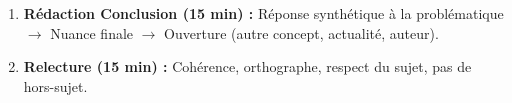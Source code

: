 \documentclass[11pt]{article}
\begin{document}
\begin{methode}
\begin{enumerate}
\begin{itemize}
                \item Structure paragraphe : \textbf{Phrase thèse} $\rightarrow$ \textbf{Explication/Argumentation} (Auteur, Concept, Raisonnement) $\rightarrow$ \textbf{Exemple concret / Illustration} $\rightarrow$ \textbf{Mini-transition/Conclusion partielle}.
                \item \textbf{Transitions explicites} entre parties (reprise problématique + annonce suivante).
            \end{itemize}
        \item \textbf{Rédaction Conclusion (15 min) :} Réponse synthétique à la problématique $\rightarrow$ Nuance finale $\rightarrow$ Ouverture (autre concept, actualité, auteur).
        \item \textbf{Relecture (15 min) :} Cohérence, orthographe, respect du sujet, pas de hors-sujet.
    \end{enumerate}
\end{methode}
\end{document}
